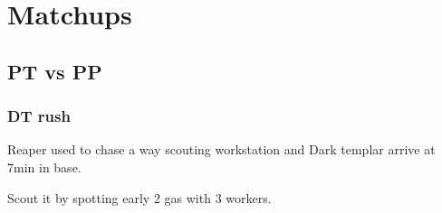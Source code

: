 \documentclass{article}
\begin{document}
\section{Matchups}
\subsection{PT vs PP}
\subsubsection{DT rush}
Reaper used to chase a way scouting workstation and Dark
templar arrive at 7min in base.

Scout it by spotting early 2 gas with 3 workers.
\end{document}
